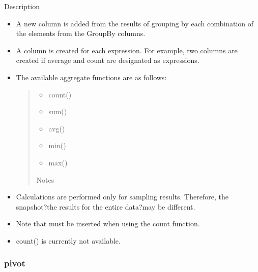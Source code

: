 \documentclass[letterpaper,10pt,english]{sphinxmanual}
\begin{document}
Description
\begin{itemize}
\item {} 
A new column is added from the results of grouping by each combination of the elements from the GroupBy columns.

\item {} 
A column is created for each expression. For example, two columns are created if average and count are designated as expressions.

\item {} 
The available aggregate functions are as follows:
\begin{quote}
\begin{itemize}
\item {} 
count()

\item {} 
sum()

\item {} 
avg()

\item {} 
min()

\item {} 
max()

\end{itemize}

Notes
\end{quote}

\item {} 
Calculations are performed only for sampling results. Therefore, the snapshot?the results for the entire data?may be different.

\item {} 
Note that \sphinxcode{\sphinxupquote{()}} must be inserted when using the count function.

\item {} 
count() is currently not available.
\begin{quote}

\begin{figure}[H]
\centering

\noindent{}
\end{figure}
\end{quote}

\end{itemize}


\subsubsection{pivot}
\label{\detokenize{discovery/part07/rule_kinds:pivot}}
\begin{figure}[H]
\centering

\noindent{}
\end{figure}
\end{document}
